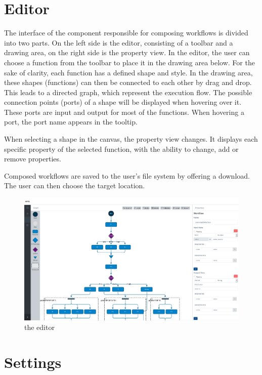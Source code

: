 \documentclass[a4paper,12pt,pdftex,halfparskip,cleardoubleempty,bibtotoc,liststotoc]{scrbook}
\begin{document}
\section{Editor}
\par
The interface of the component responsible for composing workflows is divided into two parts. On the left side is the editor, consisting of a toolbar and a drawing area, on the right side is the property view. In the editor, the user can choose a function from the toolbar to place it in the drawing area below.  For the sake of clarity, each function has a defined shape and style. In the drawing area, these shapes (functions) can then be connected to each other by drag and drop. This leads to a directed graph, which represent the execution flow. The possible connection points (ports) of a shape will be displayed when hovering over it. These ports are input and output for most of the functions. When hovering a port, the port name appears in the tooltip.
\par
When selecting a shape in the canvas, the property view changes. It displays each specific property of the selected function, with the ability to change, add or remove properties.

Composed workflows are saved to the user's file system by offering a download. The user can then choose the target location.

\begin{figure}[H]
  \centering
  \includegraphics[width=\textwidth]{editor}
  \caption{the editor}
\end{figure}

\section{Settings}


\end{document}
